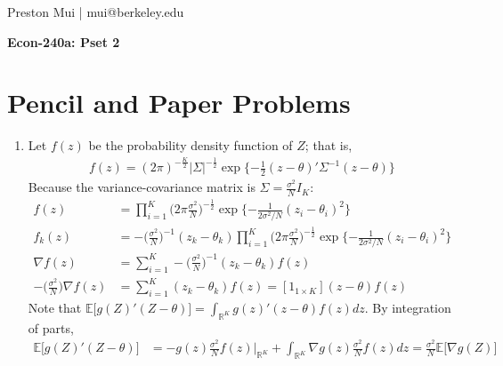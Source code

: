 \documentclass{article}[12pt]
\begin{document}
\begin{center}
	Preston Mui | mui@berkeley.edu

	{\bf Econ-240a: Pset 2}
\end{center}


\section{Pencil and Paper Problems}
\begin{enumerate}
    \item Let $f(z)$ be the probability density function of $Z$; that is, 
    \begin{align*}
        f(z) = (2\pi)^{-\frac{K}{2}} |\Sigma|^{-\frac{1}{2}} \exp \{ -\frac{1}{2} (z - \theta)' \Sigma^{-1} (z-\theta) \}
    \end{align*}
    Because the variance-covariance matrix is $\Sigma = \frac{\sigma^2}{N} I_K$:
    \begin{align*}
        f(z) &= \prod_{i=1}^K \bigg( 2\pi \frac{\sigma^2}{N} \bigg)^{-\frac{1}{2}} \exp \{ -\frac{1}{2\sigma^2 / N} (z_i - \theta_i)^2 \} \\
        f_k(z) &= - \bigg( \frac{\sigma^2}{N} \bigg)^{-1} (z_k - \theta_k) \prod_{i=1}^K \bigg( 2\pi \frac{\sigma^2}{N} \bigg)^{-\frac{1}{2}} \exp \{ -\frac{1}{2\sigma^2 / N} (z_i - \theta_i)^2 \} \\
        \nabla f(z) &= \sum_{i=1}^K - \bigg( \frac{\sigma^2}{N} \bigg)^{-1} (z_k - \theta_k) f(z) \\
        - \bigg( \frac{\sigma^2}{N} \bigg) \nabla f(z) &= \sum_{i=1}^K (z_k - \theta_k) f(z) = [1_{1 \times K}] (z - \theta) f(z)
        \end{align*}
    Note that $\mathbb{E}\bigg[ g(Z)' (Z-\theta) \bigg] = \int_{\mathbb{R}^K} g(z)' (z-\theta) f(z) dz$. By integration of parts,
    \begin{align*}
        \mathbb{E}\bigg[ g(Z)' (Z-\theta) \bigg] &= - g(z) \frac{\sigma^2}{N} f(z) \bigg|_{\mathbb{R}^K} + \int_{\mathbb{R}^K} \nabla g(z) \frac{\sigma^2}{N} f(z)dz = \frac{\sigma^2}{N} \mathbb{E} \bigg[ \nabla g(Z) \bigg]
    \end{align*}


\end{enumerate}
\end{document}
